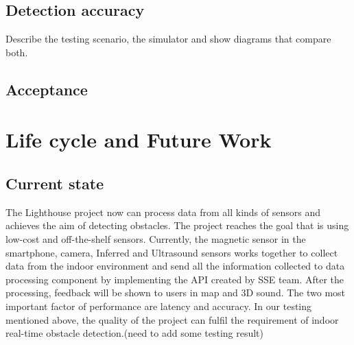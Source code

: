 \documentclass[prodmode,acmtosem]{acmsmall} %
\begin{document}
\subsection{Detection accuracy}
Describe the testing scenario, the simulator and show diagrams that compare both.


\subsection{Acceptance}

\section{Life cycle and Future Work}
\subsection{Current state}
The Lighthouse project now can process data from all kinds of sensors and achieves the aim of detecting obstacles. The project reaches the goal that is using low-cost and off-the-shelf sensors. Currently, the magnetic sensor in the smartphone, camera, Inferred and Ultrasound sensors works together to collect data from the indoor environment and send all the information collected to data processing component by implementing the API created by SSE team. After the processing, feedback will be shown to users in map and 3D sound. The two most important factor of performance are latency and accuracy. In our testing mentioned above, the quality of the project can fulfil the requirement of indoor real-time obstacle detection.(need to add some testing result)
\end{document}
